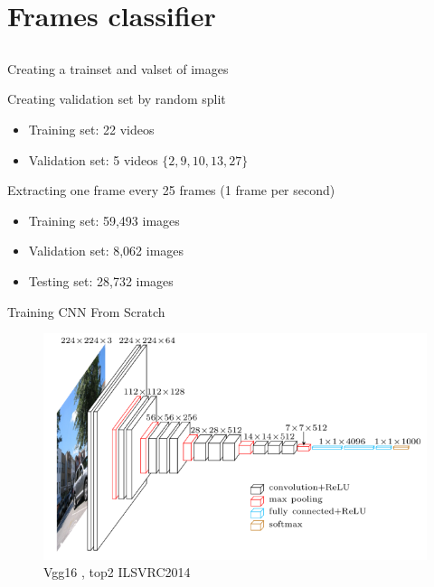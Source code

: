 \section{Frames classifier} \subsection{}\label{}

\begin{frame}{Creating a trainset and valset of images}

	\begin{block}{Creating validation set by random split}
	\begin{itemize}
		\item Training set: 22 videos
		\item Validation set: 5 videos $\{2,9,10,13,27\}$
	\end{itemize}
	\end{block}	
	
	\begin{block}{Extracting one frame every 25 frames (1 frame per second)}
	\begin{itemize}
		\item Training set: 59,493 images
		\item Validation set: 8,062 images
		\item Testing set: 28,732 images
	\end{itemize}
	\end{block}
	

\end{frame}

\begin{frame}{Training CNN From Scratch}

	\begin{figure}[h]
		\centering
		\includegraphics[width=.80\linewidth]{images/vgg16.png}
		\caption{\small Vgg16 \cite{simonyan2014very}, top2 ILSVRC2014}
		\label{fig:quora-invariance-1}
	\end{figure}
	
\end{frame}


